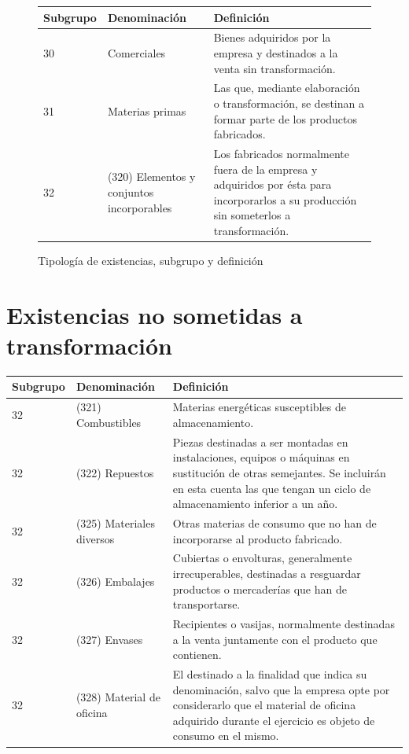 \documentclass{article}
\begin{document}
\begin{figure}[h]
    \centering
    \begin{tabular}{|m{2cm}|m{3cm}|m{6cm}|}
        \hline
        \textbf{Subgrupo} & \textbf{Denominación} & \textbf{Definición} \\
        \hline
        30 & Comerciales & Bienes adquiridos por la empresa y destinados a la venta sin transformación. \\
        \hline
        31 & Materias primas & Las que, mediante elaboración o transformación, se destinan a formar parte de los productos fabricados. \\
        \hline
        32 & (320) Elementos y conjuntos incorporables & Los fabricados normalmente fuera de la empresa y adquiridos por ésta para incorporarlos a su producción sin someterlos a transformación. \\
        \hline
    \end{tabular}
    \caption{Tipología de existencias, subgrupo y definición}
\end{figure}

\section*{Existencias no sometidas a transformación}

\begin{tabular}{|p{4cm}|p{4cm}|p{4cm}|}
\hline
\textbf{Subgrupo} & \textbf{Denominación} & \textbf{Definición} \\
\hline
32 & (321) Combustibles & Materias energéticas susceptibles de almacenamiento. \\
\hline
32 & (322) Repuestos & Piezas destinadas a ser montadas en instalaciones, equipos o máquinas en sustitución de otras semejantes. Se incluirán en esta cuenta las que tengan un ciclo de almacenamiento inferior a un año. \\
\hline
32 & (325) Materiales diversos & Otras materias de consumo que no han de incorporarse al producto fabricado. \\
\hline
32 & (326) Embalajes & Cubiertas o envolturas, generalmente irrecuperables, destinadas a resguardar productos o mercaderías que han de transportarse. \\
\hline
32 & (327) Envases & Recipientes o vasijas, normalmente destinadas a la venta juntamente con el producto que contienen. \\
\hline
32 & (328) Material de oficina & El destinado a la finalidad que indica su denominación, salvo que la empresa opte por considerarlo que el material de oficina adquirido durante el ejercicio es objeto de consumo en el mismo. \\
\hline
\end{tabular}
\end{document}
